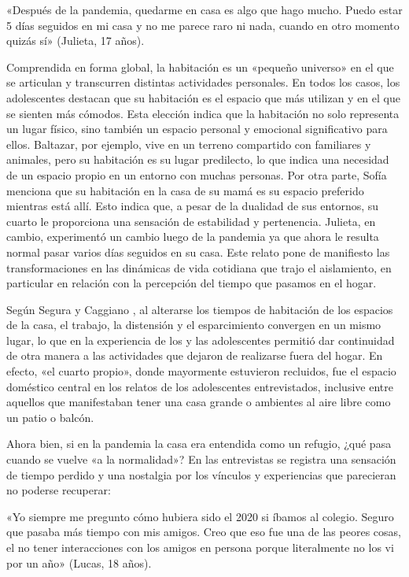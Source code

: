 \begin{refsection}
\begin{gbcita}
«Después de la pandemia, quedarme en casa es algo que hago mucho. Puedo estar 5 días seguidos en mi casa y no me parece raro ni nada, cuando en otro momento quizás sí» (Julieta, 17 años).

\end{gbcita}

Comprendida en forma global, la habitación es un «pequeño universo» en el que se articulan y transcurren distintas actividades personales. En todos los casos, los adolescentes destacan que su habitación es el espacio que más utilizan y en el que se sienten más cómodos. Esta elección indica que la habitación no solo representa un lugar físico, sino también un espacio personal y emocional significativo para ellos. Baltazar, por ejemplo, vive en un terreno compartido con familiares y animales, pero su habitación es su lugar predilecto, lo que indica una necesidad de un espacio propio en un entorno con muchas personas. Por otra parte, Sofía menciona que su habitación en la casa de su mamá es su espacio preferido mientras está allí. Esto indica que, a pesar de la dualidad de sus entornos, su cuarto le proporciona una sensación de estabilidad y pertenencia. Julieta, en cambio, experimentó un cambio luego de la pandemia ya que ahora le resulta normal pasar varios días seguidos en su casa. Este relato pone de manifiesto las transformaciones en las dinámicas de vida cotidiana que trajo el aislamiento, en particular en relación con la percepción del tiempo que pasamos en el hogar.

Según Segura y Caggiano \protect\parencite*[págs.~6-7]{4190-CAGGIANO2021}, al alterarse los tiempos de habitación de los espacios de la casa, el trabajo, la distensión y el esparcimiento convergen en un mismo lugar, lo que en la experiencia de los y las adolescentes permitió dar continuidad de otra manera a las actividades que dejaron de realizarse fuera del hogar. En efecto, «el cuarto propio», donde mayormente estuvieron recluidos, fue el espacio doméstico central en los relatos de los adolescentes entrevistados, inclusive entre aquellos que manifestaban tener una casa grande o ambientes al aire libre como un patio o balcón.

Ahora bien, si en la pandemia la casa era entendida como un refugio, ¿qué pasa cuando se vuelve «a la normalidad»? En las entrevistas se registra una sensación de tiempo perdido y una nostalgia por los vínculos y experiencias que parecieran no poderse recuperar:


\begin{gbcita}
«Yo siempre me pregunto cómo hubiera sido el 2020 si íbamos al colegio. Seguro que pasaba más tiempo con mis amigos. Creo que eso fue una de las peores cosas, el no tener interacciones con los amigos en persona porque literalmente no los vi por un año» (Lucas, 18 años).


\end{gbcita}
\end{refsection}
